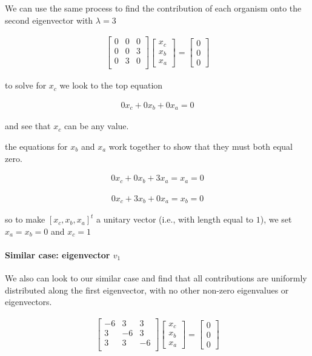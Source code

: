 \documentclass[
  letterpaper,
  DIV=11,
  numbers=noendperiod]{scrartcl}
\let\oldparagraph\paragraph
\renewcommand{\paragraph}[1]{\oldparagraph{#1}\mbox{}}
\begin{document}
We can use the same process to find the contribution of each organism
onto the second eigenvector with \(\lambda = 3\)

\begin{align*}
\begin{bmatrix}
    0&0&0\\
    0&0&3\\
    0&3&0\\
\end{bmatrix}\begin{bmatrix}x_c\\x_b\\x_a\end{bmatrix}= \begin{bmatrix}0\\0\\0\end{bmatrix}
\end{align*}

to solve for \(x_c\) we look to the top equation

\begin{align*}
0x_c + 0x_b + 0x_a = 0
\end{align*}

and see that \(x_c\) can be any value.

the equations for \(x_b\) and \(x_a\) work together to show that they
must both equal zero.

\begin{align*}
0x_c + 0x_b + 3x_a = x_a = 0
\end{align*}

\begin{align*}
0x_c + 3x_b + 0x_a = x_b = 0
\end{align*}

so to make \([x_c,x_b,x_a]^t\) a unitary vector (i.e., with length equal
to \(1\)), we set \(x_a = x_b = 0\) and \(x_c = 1\)

\hypertarget{similar-case-eigenvector-v_1}{%
\paragraph{\texorpdfstring{Similar case: eigenvector
\(v_1\)}{Similar case: eigenvector v\_1}}\label{similar-case-eigenvector-v_1}}

We also can look to our similar case and find that all contributions are
uniformly distributed along the first eigenvector, with no other
non-zero eigenvalues or eigenvectors.

\begin{align*}
\begin{bmatrix}
    -6&3&3\\
    3&-6&3\\
    3&3&-6\\
\end{bmatrix}\begin{bmatrix}x_c\\x_b\\x_a\end{bmatrix}= \begin{bmatrix}0\\0\\0\end{bmatrix}
\end{align*}
\end{document}
